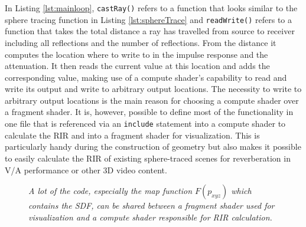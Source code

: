 \documentclass[twoside,a4paper]{article}
\begin{document}
In Listing \ref{lst:mainloop}, \texttt{castRay()} refers to a function that looks similar to the sphere tracing function in Listing \ref{lst:sphereTrace} and \texttt{readWrite()} refers to a function that takes the total distance a ray has travelled from source to receiver including all reflections and the number of reflections. From the distance it computes the location where to write to in the impulse response and the attenuation. It then reads the current value at this location and adds the corresponding value, making use of a compute shader's capability to read and write its output and write to arbitrary output locations. The necessity to write to arbitrary output locations is the main reason for choosing a compute shader over a fragment shader. It is, however, possible to define most of the functionality in one file that is referenced via an \texttt{include} statement into a compute shader to calculate the RIR and into a fragment shader for visualization. This is particularly handy during the construction of geometry but also makes it possible to easily calculate the RIR of existing sphere-traced scenes for reverberation in V/A performance or other 3D video content.


\begin{figure}[ht]
\center
{}
\caption{\label{fig:bd_shaders}{\it A lot of the code, especially the map function $F(p_{xyz})$ which contains the SDF, can be shared between a fragment shader used for visualization and a compute shader responsible for RIR calculation.}}
\end{figure}
\end{document}
